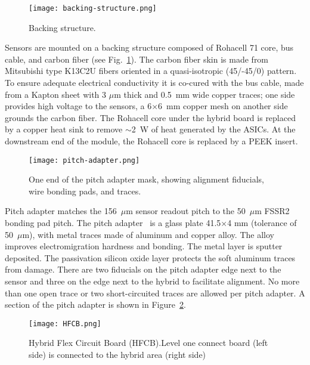\begin{figure}[hbt] 
\centering 
\texttt{[image: backing-structure.png]}
\caption{Backing structure.}
\label{fig:backing-structure}
\end{figure}

Sensors are mounted on a backing structure composed of Rohacell 71 core, bus cable, and carbon fiber (see Fig.~\ref{fig:backing-structure}). The carbon fiber skin is made from Mitsubishi type K13C2U fibers oriented in a quasi-isotropic (45/-45/0) pattern. To ensure adequate electrical conductivity it is co-cured with the bus cable, made from a Kapton sheet with 3 $\mu$m thick and 0.5~mm wide copper traces; one side provides high voltage to the sensors, a 6$\times$6~mm copper mesh on another side grounds the carbon fiber.  The Rohacell core under the hybrid board is replaced by a copper heat sink to remove $\sim$2~W of heat generated by the ASICs. At the downstream end of the module, the Rohacell core is replaced by a PEEK insert.  

\begin{figure}[hbt] 
\centering 
\texttt{[image: pitch-adapter.png]}
\caption{One end of the pitch adapter mask, showing alignment fiducials, wire bonding pads, and traces.}
\label{fig:pitch-adapter}
\end{figure}

Pitch adapter matches the 156~$\mu$m sensor readout pitch to the 50~$\mu$m FSSR2 bonding pad pitch. The pitch adapter~\cite{PA} is a glass plate 41.5$\times$4 mm (tolerance of 50~$\mu$m), with metal traces made of aluminum and copper alloy. The alloy improves electromigration hardness and bonding. The metal layer is sputter deposited. The passivation silicon oxide layer protects the soft aluminum traces from damage. There are two fiducials on the pitch adapter edge next to the sensor and three on the edge next to the hybrid to facilitate alignment. No more than one open trace or two short-circuited traces are allowed per pitch adapter. A section of the pitch adapter is shown in Figure~\ref{fig:pitch-adapter}. 

\begin{figure}[hbt] 
\centering 
\texttt{[image: HFCB.png]}
\caption{Hybrid Flex Circuit Board (HFCB).Level one connect board (left side) is connected to the hybrid area (right side)}
\label{fig:HFCB}
\end{figure}

